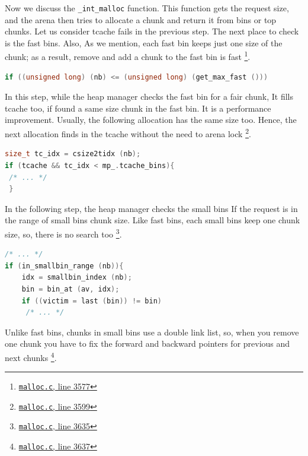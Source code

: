 \documentclass{masterthesis}
\newcommand*\tch{tcache}
\newcommand*\fb{fast bins}
\newcommand*\sbs{small bins}
\begin{document}
Now we discuss the \lstinline{_int_malloc} function. This function gets the request size, and the arena then tries to allocate a chunk and return it from bins or top chunks. Let us consider \tch{} fails in the previous step. The next place to check is the \fb{}. Also, As we mention, each fast bin keeps just one size of the chunk; as a result, remove and add a chunk to the fast bin is fast \footnote{\href{https://sourceware.org/git/?p=glibc.git;a=blob;f=malloc/malloc.c;h=f7cd29bc2f93e1082ee77800bd64a4b2a2897055;hb=9ea3686266dca3f004ba874745a4087a89682617\#l3577}{\texttt{malloc.c}, line 3577}}.

\begin{lstlisting}[language=c,frame=tlrb]
if ((unsigned long) (nb) <= (unsigned long) (get_max_fast ()))
\end{lstlisting}

In this step, while the heap manager checks the fast bin for a fair chunk, It fills \tch{} too, if found a same size chunk in the fast bin. It is a performance improvement. Usually, the following allocation has the same size too. Hence, the next allocation finds in the \tch{} without the need to arena lock \footnote{\href{https://sourceware.org/git/?p=glibc.git;a=blob;f=malloc/malloc.c;h=f7cd29bc2f93e1082ee77800bd64a4b2a2897055;hb=9ea3686266dca3f004ba874745a4087a89682617\#l3599}{\texttt{malloc.c}, line 3599}}.

\begin{lstlisting}[language=c,frame=tlrb]
size_t tc_idx = csize2tidx (nb);
if (tcache && tc_idx < mp_.tcache_bins){
 /* ... */
 }
\end{lstlisting}

In the following step, the heap manager checks the \sbs{} If the request is in the range of \sbs{} chunk size. Like \fb{}, each \sbs{} keep one chunk size, so, there is no search too \footnote{\href{https://sourceware.org/git/?p=glibc.git;a=blob;f=malloc/malloc.c;h=f7cd29bc2f93e1082ee77800bd64a4b2a2897055;hb=9ea3686266dca3f004ba874745a4087a89682617\#l3635}{\texttt{malloc.c}, line 3635}}.

\begin{lstlisting}[language=c,frame=tlrb]
 /* ... */
if (in_smallbin_range (nb)){
	idx = smallbin_index (nb);
	bin = bin_at (av, idx);
	if ((victim = last (bin)) != bin)
	 /* ... */
\end{lstlisting}

Unlike \fb{}, chunks in \sbs{} use a double link list, so, when you remove one chunk you have to fix the forward and backward pointers for previous and next chunks \footnote{\href{https://sourceware.org/git/?p=glibc.git;a=blob;f=malloc/malloc.c;h=f7cd29bc2f93e1082ee77800bd64a4b2a2897055;hb=9ea3686266dca3f004ba874745a4087a89682617\#l3637}{\texttt{malloc.c}, line 3637}}.
\end{document}
